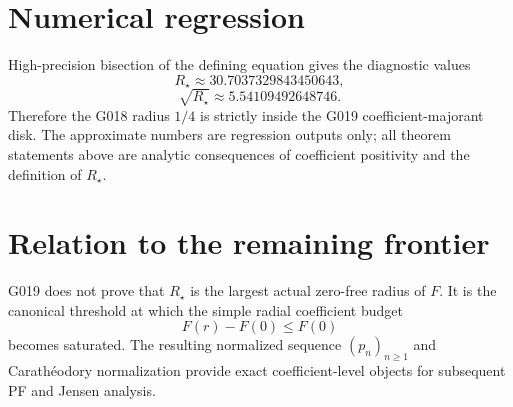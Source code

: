 \section{Numerical regression}

High-precision bisection of the defining equation gives the diagnostic values
\[
 R_\star\approx30.7037329843450643,
\]
\[
 \sqrt{R_\star}\approx5.54109492648746.
\]
Therefore the G018 radius $1/4$ is strictly inside the G019 coefficient-majorant disk. The approximate numbers are regression outputs only; all theorem statements above are analytic consequences of coefficient positivity and the definition of $R_\star$.

\section{Relation to the remaining frontier}

G019 does not prove that $R_\star$ is the largest actual zero-free radius of $F$. It is the canonical threshold at which the simple radial coefficient budget
\[
 F(r)-F(0)\le F(0)
\]
becomes saturated. The resulting normalized sequence $(p_n)_{n\ge1}$ and Carath\'eodory normalization provide exact coefficient-level objects for subsequent PF and Jensen analysis.

